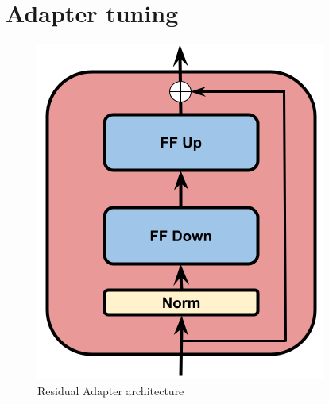 

\section{Adapter tuning}

\begin{figure}[t]
    \begin{center}
    \includegraphics[scale=0.3]{imgs/Adapter_alone.png}
    \caption{Residual Adapter architecture}
    \label{fig:Adapter_architecture}
    \end{center}
    \end{figure}


